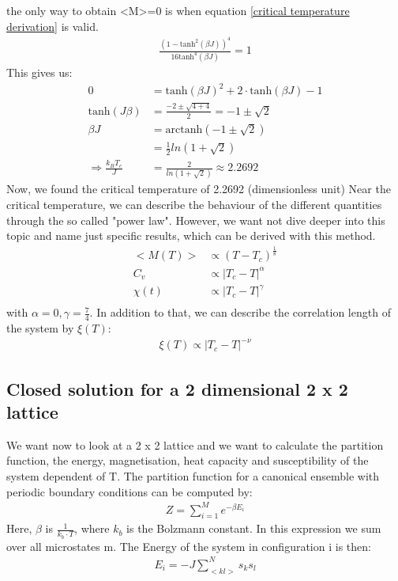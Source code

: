 \documentclass[10pt,a4paper]{article}
\begin{document}
the only way to obtain <M>=0 is when equation \ref{critical temperature derivation} is valid. 
\begin{align}
\frac{(1 - \mathrm{tanh}^2(\beta J))^{4}}{16\mathrm{tanh}^{4}(\beta J)} = 1 \label{critical temperature derivation}
\end{align}
This gives us:
\begin{align}
0&=\mathrm{tanh}(\beta J )^2+2 \cdot \mathrm{tanh}(\beta J ) -1 \\
\mathrm{tanh}(J \beta ) &= \frac{-2 \pm \sqrt{4+4}}{2} = -1 \pm \sqrt{2}\\
\beta J &= \mathrm{arctanh}(-1 \pm \sqrt{2})\\
&= \frac{1}{2} ln(1+\sqrt{2})\\
\Rightarrow \frac {k_B T_c}{J} &= \frac{2}{ln(1+\sqrt{2})}\approx 2.2692
\end{align}
Now, we found the critical temperature of 2.2692 (dimensionless unit)
Near the critical temperature, we can describe the behaviour of the different quantities through the so called "power law". However, we want not dive deeper into this topic and name just specific results, which can be derived with this method.
\begin{align}
<M(T)> & \propto (T-T_c)^{\frac{1}{8}}\\
C_v & \propto \left| T_c - T \right|^{\alpha}\\
\chi ( t)& \propto \left| T_c - T \right|^{\gamma}\\
\end{align}
with $\alpha=0, \gamma=\frac{7}{4} $. In addition to that, we can describe the correlation length of the system by $\xi(T) $:
\begin{align}
\xi (T) \propto \left| T_c - T \right|^{-\nu}
\end{align}

\subsection{Closed solution for a 2 dimensional 2 x 2 lattice \label{closed_solution}}

We want now to look at a 2 x 2 lattice and we want to calculate the partition function, the energy, magnetisation, heat capacity and susceptibility of the system  dependent of T. 
The partition function for a canonical ensemble with periodic boundary conditions can be computed  by:
\begin{align}
Z= \sum_{i=1}^{M} e^{- \beta E_i}
\end{align} 
Here, $\beta$ is $\frac{1}{k_b \cdot T}$, where $k_b$ is the Bolzmann constant. 
In this expression we sum over all microstates m. The Energy of the system in configuration i is then:
\begin{align}
E_i = - J \sum_{<kl>}^N s_k s_l 
\end{align} 
\end{document}
